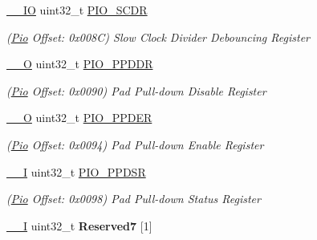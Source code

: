 \begin{DoxyCompactItemize}
\mbox{\label{structPio_a473d417864f780fdc1120a790814e9f1}} 
\mbox{\hyperlink{core__cm7_8h_aec43007d9998a0a0e01faede4133d6be}{\+\_\+\+\_\+\+IO}} uint32\+\_\+t \mbox{\hyperlink{structPio_a473d417864f780fdc1120a790814e9f1}{P\+I\+O\+\_\+\+S\+C\+DR}}
\begin{DoxyCompactList}\small\item\em (\mbox{\hyperlink{structPio}{Pio}} Offset\+: 0x008C) Slow Clock Divider Debouncing Register \end{DoxyCompactList}\item 
\mbox{\label{structPio_ab2e57e5c03c9d8daf8b58b4e649423f7}} 
\mbox{\hyperlink{core__cm7_8h_a7e25d9380f9ef903923964322e71f2f6}{\+\_\+\+\_\+O}} uint32\+\_\+t \mbox{\hyperlink{structPio_ab2e57e5c03c9d8daf8b58b4e649423f7}{P\+I\+O\+\_\+\+P\+P\+D\+DR}}
\begin{DoxyCompactList}\small\item\em (\mbox{\hyperlink{structPio}{Pio}} Offset\+: 0x0090) Pad Pull-\/down Disable Register \end{DoxyCompactList}\item 
\mbox{\label{structPio_afce9b34f18ff3d3e3d9300161da029dd}} 
\mbox{\hyperlink{core__cm7_8h_a7e25d9380f9ef903923964322e71f2f6}{\+\_\+\+\_\+O}} uint32\+\_\+t \mbox{\hyperlink{structPio_afce9b34f18ff3d3e3d9300161da029dd}{P\+I\+O\+\_\+\+P\+P\+D\+ER}}
\begin{DoxyCompactList}\small\item\em (\mbox{\hyperlink{structPio}{Pio}} Offset\+: 0x0094) Pad Pull-\/down Enable Register \end{DoxyCompactList}\item 
\mbox{\label{structPio_a2a93258792166f08356cf1acf4d64967}} 
\mbox{\hyperlink{core__cm7_8h_af63697ed9952cc71e1225efe205f6cd3}{\+\_\+\+\_\+I}} uint32\+\_\+t \mbox{\hyperlink{structPio_a2a93258792166f08356cf1acf4d64967}{P\+I\+O\+\_\+\+P\+P\+D\+SR}}
\begin{DoxyCompactList}\small\item\em (\mbox{\hyperlink{structPio}{Pio}} Offset\+: 0x0098) Pad Pull-\/down Status Register \end{DoxyCompactList}\item 
\mbox{\label{structPio_a11f9380cfd8e00164fcd3458bf2ac0a2}} 
\mbox{\hyperlink{core__cm7_8h_af63697ed9952cc71e1225efe205f6cd3}{\+\_\+\+\_\+I}} uint32\+\_\+t {\bfseries Reserved7} \mbox{[}1\mbox{]}

\end{DoxyCompactItemize}
